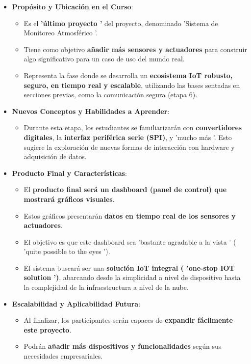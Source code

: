 \documentclass{report}
\begin{document}
\begin{itemize}
    \item \textbf{Propósito y Ubicación en el Curso}:
    \begin{itemize}
        \item Es el \textbf{ 'último proyecto '} del proyecto, denominado  'Sistema de Monitoreo Atmosférico '.
        \item Tiene como objetivo \textbf{añadir más sensores y actuadores} para construir algo significativo para un caso de uso del mundo real.
        \item Representa la fase donde se desarrolla un \textbf{ecosistema IoT robusto, seguro, en tiempo real y escalable}, utilizando las bases 
        sentadas en secciones previas, como la comunicación segura (etapa 6).
    \end{itemize}
    \item \textbf{Nuevos Conceptos y Habilidades a Aprender}:
    \begin{itemize}
        \item Durante esta etapa, los estudiantes se familiarizarán con \textbf{convertidores digitales}, la \textbf{interfaz periférica serie 
        (SPI)}, y  'mucho más '. Esto sugiere la exploración de nuevas formas de interacción con hardware y adquisición de datos.
    \end{itemize}
    \item \textbf{Producto Final y Características}:
    \begin{itemize}
        \item El \textbf{producto final será un dashboard (panel de control) que mostrará gráficos visuales}.
        \item Estos gráficos presentarán \textbf{datos en tiempo real de los sensores y actuadores}.
        \item El objetivo es que este dashboard sea  'bastante agradable a la vista ' ( 'quite possible to the eyes ').
        \item El sistema buscará ser una \textbf{solución IoT integral ( 'one-stop IOT solution ')}, abarcando desde la simplicidad a nivel de 
        dispositivo hasta la complejidad de la infraestructura a nivel de la nube.
    \end{itemize}
    \item \textbf{Escalabilidad y Aplicabilidad Futura}:
    \begin{itemize}
        \item Al finalizar, los participantes serán capaces de \textbf{expandir fácilmente este proyecto}.
        \item Podrán \textbf{añadir más dispositivos y funcionalidades} según sus necesidades empresariales.
    \end{itemize}
\end{itemize}
\end{document}
